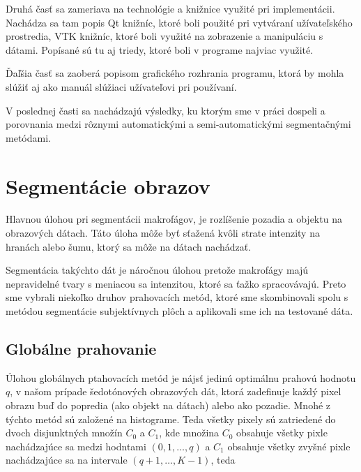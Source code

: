 \documentclass[a4paper,11pt,twoside]{article}%
\begin{document}
Druhá časť sa zameriava na technológie a knižnice využité pri implementácii. Nachádza sa tam popis Qt knižníc, ktoré boli použité pri vytváraní užívateľského prostredia, VTK knižníc, ktoré boli využité na zobrazenie a manipuláciu s dátami. Popísané sú tu aj triedy, ktoré boli v programe najviac využité.

Ďaľšia časť sa zaoberá popisom grafického rozhrania programu, ktorá by mohla slúžiť aj ako manuál slúžiaci užívateľovi pri používaní.

V poslednej časti sa nachádzajú výsledky, ku ktorým sme v práci dospeli a porovnania medzi rôznymi automatickými a semi-automatickými segmentačnými metódami.

  
 


\section{Segmentácie obrazov}

%

Hlavnou úlohou pri segmentácii makrofágov, je rozlíšenie pozadia a objektu na obrazových dátach. Táto úloha môže byť sťažená kvôli strate intenzity na hranách alebo šumu, ktorý sa môže na dátach nachádzať.


Segmentácia takýchto dát je náročnou úlohou pretože makrofágy majú nepravidelné tvary s meniacou sa intenzitou, ktoré sa ťažko spracovávajú. Preto sme vybrali niekoľko druhov prahovacích metód, ktoré sme skombinovali spolu s metódou segmentácie subjektívnych plôch a aplikovali sme ich na testované dáta.

\subsection{Globálne prahovanie}

 Úlohou globálnych ptahovacích metód je nájsť jedinú optimálnu prahovú hodnotu $q$, v našom prípade šedotónových obrazových dát, ktorá zadefinuje každý pixel obrazu buď do popredia (ako objekt na dátach) alebo ako pozadie. Mnohé z týchto metód sú založené na histograme. Teda všetky pixely sú zatriedené do dvoch disjunktných množín $C_0$ a $C_1$, kde množina $C_0$ obsahuje všetky pixle nachádzajúce sa medzi hodntami $(0, 1, \dots , q)$ a $C_1$ obsahuje všetky zvyšné pixle nachádzajúce sa na intervale $(q+1, \dots , K-1)$, teda
\end{document}
